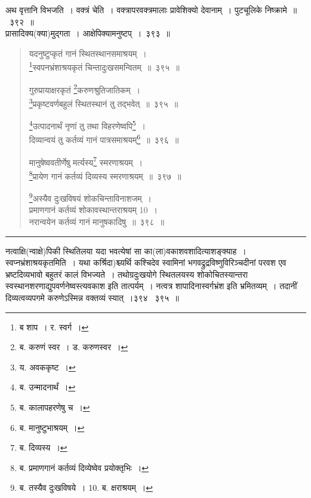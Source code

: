 \documentclass[11pt, openany]{book}
\begin{document}
अथ वृत्तानि विभजति~। वक्त्रं चेति~। वक्त्रापरवक्त्रमालाः प्रावेशिक्यो देवानाम्~। पुटचूलिके निष्क्रामे~॥~३९२~॥\\

{\qtt प्रासादिक्य}(क्या)मुद्गता~। आक्षेपिक्यामनुष्टप्~।~३९३~॥

\newpage

\begin{quote}
{\na यदनुष्टुप्कृतं गानं स्थितस्थानसमाश्रयम्~।\\
 \renewcommand{\thefootnote}{1}\footnote{ब शाप~। र. स्वर्ग~।}स्वपनभ्रंशाश्रयकृतं चिन्तादुःखसमन्वितम्~॥~३९५~॥

 गुरुप्रायाक्षरकृतं \renewcommand{\thefootnote}{2}\footnote{ब. करुणं स्वर~। ड. करुणस्वर~।}करुणश्रुतिजातिकम्~।\\
 \renewcommand{\thefootnote}{3}\footnote{य. अवककृष्ट~।}प्रकृष्टवर्णबहुलं स्थितस्थानं तु तद्भवेत्~॥~३९५~॥

 \renewcommand{\thefootnote}{4}\footnote{ब. उन्मादनार्थं~।}उत्पादनार्थं नृणां तु तथा विहरणेष्वपि\renewcommand{\thefootnote}{5}\footnote{ब. कालापहरणेषु च~।}~।\\
 दिव्यान्वयं तु कर्तव्यं गानं पात्रसमाश्रयम्\renewcommand{\thefootnote}{6}\footnote{ब. मानुष्टुभाश्रयम्~।}~॥~३९६~॥

 मानुषेष्ववतीर्णेषु मर्त्यस्य\renewcommand{\thefootnote}{7}\footnote{ब. दिव्यस्य~।} स्मरणाश्रयम्~।\\
 \renewcommand{\thefootnote}{8}\footnote{ब. प्रमाणगानं कर्तव्यं दिव्येष्वेव प्रयोक्तृभिः~।}प्रायेण गानं कर्तव्यं दिव्यस्य स्मरणाश्रयम्~॥~३९७~॥

 \renewcommand{\thefootnote}{9}\footnote{ब. तस्यैव दुःखविषये~। 10. ब. क्षराश्रयम्~।}अस्यैव दुःखविषयं शोकचिन्ताविनाशजम्~।\\
 प्रमाणगानं कर्तव्यं शोकावस्थान्तराश्रयम् 10~।\\
 नरान्वयेन कर्तव्यं गानं मानुषकादिषु~॥~३९८~॥}
\end{quote}

\hrule

\vspace{2mm}
नत्वाक्षि(न्वाक्षे)पिकी स्थितिलया यदा भवत्येषां सा का(ला)वकाशवशादित्याशङ्क्याह~। {\qtt स्वप्नभ्रंशाश्रयकृतमिति}~। यथा कर्श्रिदा)श्च्यर्थि कश्चिदेव स्वामिनां भगवद्रुद्रविष्णुविरिञ्चदीनां परवश एव भ्रष्टदिव्यभावो बहुतरं कालं विभज्यते~। तथोग्रदुःखयोगे स्थितलयस्य शोकोचितस्यान्तरा स्वस्थानशरणाद्युपवर्णनेष्वस्त्यवकाश इति तात्पर्यम्~। नत्वत्र शापादिनास्वर्गभ्रंश इति भ्रमितव्यम्~। तदानीं दिव्यत्वव्यपगमे करुणेऽस्मिन्न वक्तव्यं स्यात्~।३९४ \textendash\ ३९५~॥\\
\end{document}
